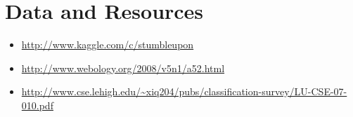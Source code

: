 \documentclass[11pt]{amsart}
\begin{document}
\section{Data and Resources}
\begin{itemize}
\item \url{http://www.kaggle.com/c/stumbleupon}
\item \url{http://www.webology.org/2008/v5n1/a52.html}
\item \url{http://www.cse.lehigh.edu/~xiq204/pubs/classification-survey/LU-CSE-07-010.pdf}
\end{itemize}

\end{document}
